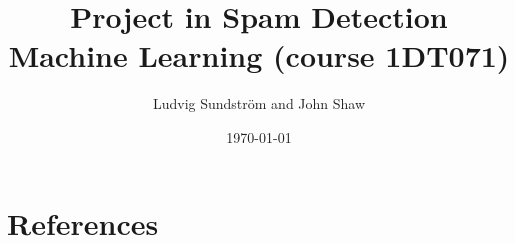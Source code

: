 \documentclass[a4paper,11pt]{article}
\title{\textbf{Project in Spam Detection} \\
    \textbf{Machine Learning (course 1DT071)} \\  
}
\author{Ludvig Sundstr\"{o}m and John Shaw}
\date{\today}
\begin{document}
\maketitle





\section{References}


\end{document}
